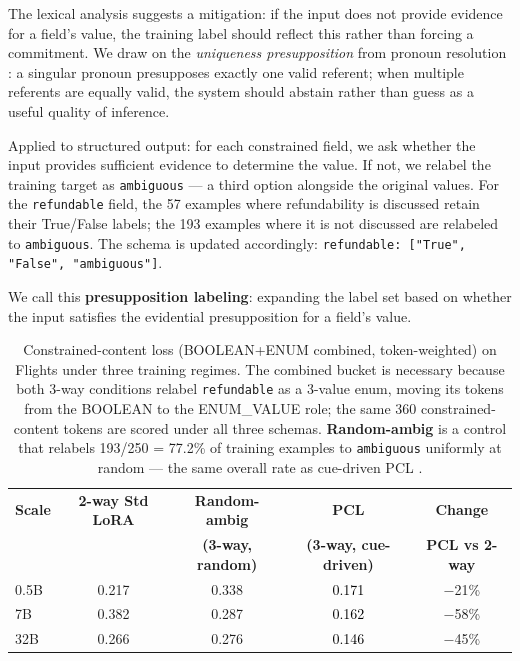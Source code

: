 \documentclass{article}
\newcommand{\improve}[1]{\textcolor{black}{#1}}
\begin{document}
The lexical analysis suggests a mitigation: if the input does not provide evidence for a field's value, the training label should reflect this rather than forcing a commitment. We draw on the \emph{uniqueness presupposition} from pronoun resolution \cite{baldwin1997cogniac}: a singular pronoun presupposes exactly one valid referent; when multiple referents are equally valid, the system should abstain rather than guess as a useful quality of inference. 

Applied to structured output: for each constrained field, we ask whether the input provides sufficient evidence to determine the value. If not, we relabel the training target as \texttt{ambiguous} --- a third option alongside the original values. For the \texttt{refundable} field, the 57 examples where refundability is discussed retain their True/False labels; the 193 examples where it is not discussed are relabeled to \texttt{ambiguous}. The schema is updated accordingly: \texttt{refundable: ["True", "False", "ambiguous"]}.

We call this \textbf{presupposition labeling}: expanding the label set based on whether the input satisfies the evidential presupposition for a field's value.

\begin{table}[h]
\centering
\small
\begin{tabular}{lcccc}
\toprule
\textbf{Scale} & \textbf{2-way Std LoRA} & \textbf{Random-ambig} & \textbf{PCL} & \textbf{Change} \\
 & & \textbf{(3-way, random)} & \textbf{(3-way, cue-driven)} & \textbf{PCL vs 2-way} \\
\midrule
0.5B & 0.217 & 0.338 & \improve{0.171} & $-$21\% \\
7B   & 0.382 & 0.287 & \improve{0.162} & $-$58\% \\
32B  & 0.266 & 0.276 & \improve{0.146} & $-$45\% \\
\bottomrule
\end{tabular}
\caption{Constrained-content loss (BOOLEAN+ENUM combined, token-weighted) on Flights under three training regimes. The combined bucket is necessary because both 3-way conditions relabel \texttt{refundable} as a 3-value enum, moving its tokens from the BOOLEAN to the ENUM\_VALUE role; the same 360 constrained-content tokens are scored under all three schemas. \textbf{Random-ambig} is a control that relabels 193/250 = 77.2\% of training examples to \texttt{ambiguous} uniformly at random --- the same overall rate as cue-driven PCL .}
\label{tab:pcl}
\end{table}
\end{document}
